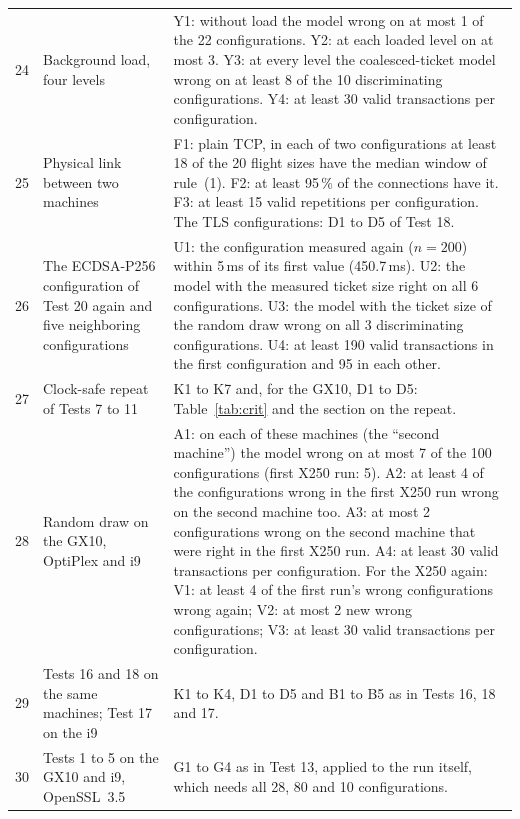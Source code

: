 \documentclass[9pt]{article}
\begin{document}
\begin{footnotesize}
\begin{longtable}{@{}p{}p{}p{}@{}}
24 & Background load, four levels & Y1: without load the model wrong on at most 1 of the 22 configurations. Y2: at each loaded level on at most 3. Y3: at every level the coalesced-ticket model wrong on at least 8 of the 10 discriminating configurations. Y4: at least 30 valid transactions per configuration.\\
25 & Physical link between two machines & F1: plain TCP, in each of two configurations at least 18 of the 20 flight sizes have the median window of rule~(1). F2: at least 95\,\% of the connections have it. F3: at least 15 valid repetitions per configuration. The TLS configurations: D1 to D5 of Test 18.\\
26 & The ECDSA-P256 configuration of Test 20 again and five neighboring configurations & U1: the configuration measured again ($n=200$) within 5\,ms of its first value (450.7\,ms). U2: the model with the measured ticket size right on all 6 configurations. U3: the model with the ticket size of the random draw wrong on all 3 discriminating configurations. U4: at least 190 valid transactions in the first configuration and 95 in each other.\\
27 & Clock-safe repeat of Tests 7 to 11 & K1 to K7 and, for the GX10, D1 to D5: Table~\ref{tab:crit} and the section on the repeat.\\
28 & Random draw on the GX10, OptiPlex and i9 & A1: on each of these machines (the ``second machine'') the model wrong on at most 7 of the 100 configurations (first X250 run: 5). A2: at least 4 of the configurations wrong in the first X250 run wrong on the second machine too. A3: at most 2 configurations wrong on the second machine that were right in the first X250 run. A4: at least 30 valid transactions per configuration. For the X250 again: V1: at least 4 of the first run's wrong configurations wrong again; V2: at most 2 new wrong configurations; V3: at least 30 valid transactions per configuration.\\
29 & Tests 16 and 18 on the same machines; Test 17 on the i9 & K1 to K4, D1 to D5 and B1 to B5 as in Tests 16, 18 and 17.\\
30 & Tests 1 to 5 on the GX10 and i9, OpenSSL~3.5 & G1 to G4 as in Test 13, applied to the run itself, which needs all 28, 80 and 10 configurations.\\

\end{longtable}
\end{footnotesize}
\end{document}
